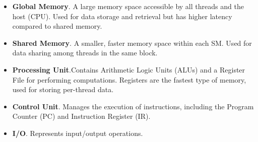 \begin{itemize}
    \item \textbf{Global Memory}. A large memory space accessible by all threads and the host (CPU). Used for data storage and retrieval but has higher latency compared to shared memory.

    \item \textbf{Shared Memory}. A smaller, faster memory space within each SM. Used for data sharing among threads in the same block.

    \item \textbf{Processing Unit}.Contains Arithmetic Logic Units (ALUs) and a Register File for performing computations. Registers are the fastest type of memory, used for storing per-thread data.

    \item \textbf{Control Unit}. Manages the execution of instructions, including the Program Counter (PC) and Instruction Register (IR).

    \item \textbf{I/O}. Represents input/output operations.
\end{itemize}